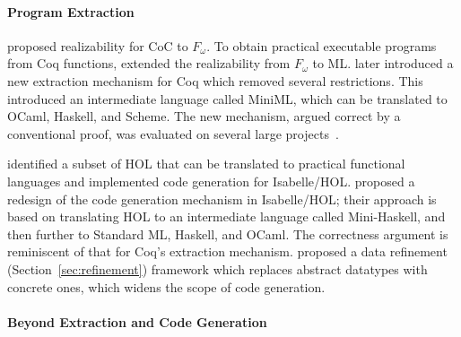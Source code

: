 \paragraph{Program Extraction}

\citet{Paulin1989,Paulin-Mohring1989} proposed realizability for CoC to $F_\omega$. To obtain practical executable programs from Coq functions, \cite{Paulin1993} extended the realizability from $F_\omega$ to ML. \cite{Letouzey2003,Letouzey2004} later introduced a new extraction mechanism for Coq which removed several restrictions. This introduced an intermediate language called MiniML, which can be translated to OCaml, Haskell, and Scheme. The new mechanism, argued correct by a conventional proof, was evaluated on several large projects~\citep{Berger2005,CruzFilipe2006,Letouzey2008}.

\cite{Berghofer2002} identified a subset of HOL that can be translated to practical functional languages and implemented code generation for Isabelle/HOL. \cite{Haftmann2010} proposed a redesign of the code generation mechanism in Isabelle/HOL; their approach is based on translating HOL to an intermediate language called Mini-Haskell, and then further to Standard ML, Haskell, and OCaml. The correctness argument is reminiscent of that for Coq's extraction mechanism. \cite{Haftmann2013} proposed a data refinement (Section~\ref{sec:refinement}) framework which replaces abstract datatypes with concrete ones, which widens the scope of code generation.



\paragraph{Beyond Extraction and Code Generation}


